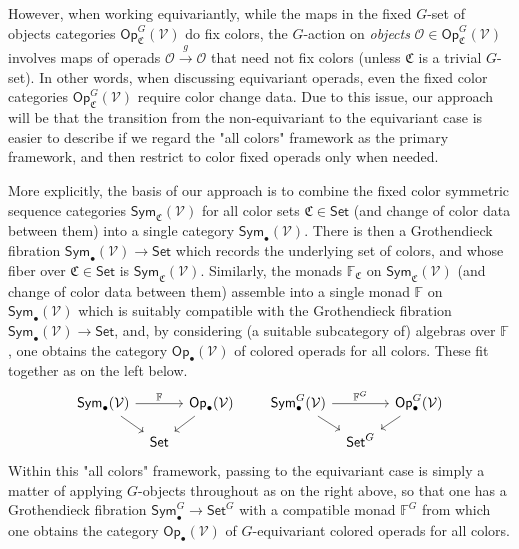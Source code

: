 \documentclass[a4paper,10pt
,draft
]{article}%
\numberwithin{equation}{section}
\numberwithin{figure}{section}
\theoremstyle{definition} %
\newcommand{\Sym}{\ensuremath{\mathsf{Sym}}}%
\newcommand{\Op}{\mathsf{Op}}%
\newcommand{\V}{\ensuremath{\mathcal V}}
\renewcommand{\O}{\ensuremath{\mathcal O}}
\newcommand{\1}{\ensuremath{\mathbbm 1}}%
\begin{document}
However, when working equivariantly, 
while the maps in the fixed $G$-set of objects categories 
$\mathsf{Op}^G_{\mathfrak{C}}(\V)$ do fix colors, 
the $G$-action on \emph{objects}
$\O \in \mathsf{Op}^G_{\mathfrak{C}}(\V)$
involves maps of operads $\O \xrightarrow{g} \O$
that need not fix colors (unless $\mathfrak{C}$ is a trivial $G$-set).
In other words, when discussing equivariant operads,
even the fixed color categories 
$\mathsf{Op}^G_{\mathfrak{C}}(\V)$
require color change data.
Due to this issue, 
our approach will be that the transition from the non-equivariant to the equivariant case is easier to describe 
if we regard the "all colors" framework as the primary framework,
and then restrict to color fixed operads only when needed.

More explicitly, the basis of our approach is to combine the 
fixed color symmetric sequence categories
$\mathsf{Sym}_{\mathfrak{C}}(\V)$ for all color sets 
$\mathfrak{C} \in \mathsf{Set}$
(and change of color data between them)
into a single category $\mathsf{Sym}_{\bullet}(\V)$.
There is then a Grothendieck fibration
$\mathsf{Sym}_{\bullet}(\V) \to \mathsf{Set}$
which records the underlying set of colors,
and whose fiber over $\mathfrak{C} \in \mathsf{Set}$ is 
$\mathsf{Sym}_{\mathfrak{C}}(\V)$.
Similarly, the monads $\mathbb{F}_{\mathfrak{C}}$
on $\mathsf{Sym}_{\mathfrak{C}}(\mathcal{V})$
(and change of color data between them) 
assemble into a single monad $\mathbb{F}$
on $\mathsf{Sym}_{\bullet}(\V)$
which is suitably compatible with 
the Grothendieck fibration 
$\mathsf{Sym}_{\bullet}(\V) \to \mathsf{Set}$,
and, by considering (a suitable subcategory of) algebras over $\mathbb{F}$,
one obtains the category $\mathsf{Op}_{\bullet}(\V)$
of colored operads for all colors.
These fit together as on the left below.
\begin{equation}\label{FIBADJMON EQ}
\begin{tikzcd}[row sep = small, column sep = tiny]
\Sym_\bullet(\V) \arrow[rr, "\mathbb F"] \arrow[dr]
&&
\Op_\bullet(\V) \arrow[dl]
&&& %
\Sym^G_\bullet(\V) \arrow[rr, "\mathbb F^G"] \arrow[dr]
&&
\Op^G_\bullet(\V) \arrow[dl]
\\
&
\mathsf{Set}
&
&&& %
&
\mathsf{Set}^G
\end{tikzcd}
\end{equation}
Within this "all colors" framework, passing to the equivariant case is simply a matter of applying $G$-objects throughout as on the right above, 
so that one has a Grothendieck fibration
$\mathsf{Sym}_{\bullet}^G \to \mathsf{Set}^G$
with a compatible monad $\mathbb{F}^G$
from which one obtains the category 
$\mathsf{Op}_{\bullet}(\V)$
of $G$-equivariant colored operads for all colors. 
\end{document}
